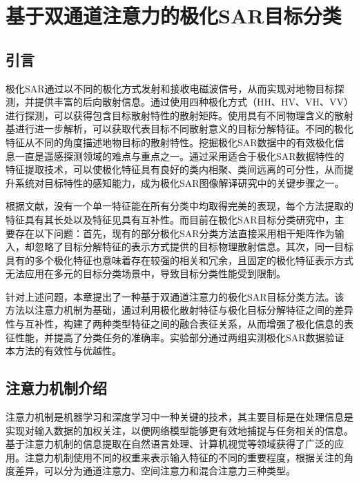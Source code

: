 \chapter{基于双通道注意力的极化SAR目标分类}
\section{引言}
极化SAR通过以不同的极化方式发射和接收电磁波信号，从而实现对地物目标探测，并提供丰富的后向散射信息。通过使用四种极化方式（HH、HV、VH、VV）进行探测，可以获得包含目标散射特性的散射矩阵。使用具有不同物理含义的散射基进行进一步解析，可以获取代表目标不同散射意义的目标分解特征。不同的极化特征从不同的角度描述地物目标的散射特性。挖掘极化SAR数据中的有效极化信息一直是遥感探测领域的难点与重点之一。通过采用适合于极化SAR数据特性的特征提取技术，可以使极化特征具有良好的类内相聚、类间远离的可分性，从而提升系统对目标特性的感知能力，成为极化SAR图像解译研究中的关键步骤之一。

根据文献\cite{刘高峰2014极化,1017062722.nh,1021744178.nh}，没有一个单一特征能在所有分类中均取得完美的表现，每个方法提取的特征具有其长处以及特征见具有互补性。而目前在极化SAR目标分类研究中，主要存在以下问题：首先，现有的部分极化SAR分类方法直接采用相干矩阵作为输入，却忽略了目标分解特征的表示方式提供的目标物理散射信息。其次，同一目标具有的多个极化特征也意味着存在较强的相关和冗余，且固定的极化特征表示方式无法应用在多元的目标分类场景中，导致目标分类性能受到限制。

针对上述问题，本章提出了一种基于双通道注意力的极化SAR目标分类方法。该方法以注意力机制为基础，通过利用极化散射特征与极化目标分解特征之间的差异性与互补性，构建了两种类型特征之间的融合表征关系，从而增强了极化信息的表征性能，并提高了分类任务的准确率。实验部分通过两组实测极化SAR数据验证本方法的有效性与优越性。

\section{注意力机制介绍}
\label{sec:sce3_1}
注意力机制是机器学习和深度学习中一种关键的技术，其主要目标是在处理信息是实现对输入数据的加权关注，以便网络模型能够更有效地捕捉与任务相关的信息。基于注意力机制的信息提取在自然语言处理、计算机视觉等领域获得了广泛的应用。注意力机制使用不同的权重来表示输入特征的不同的重要程度，根据关注的角度差异，可以分为通道注意力、空间注意力和混合注意力三种类型。
